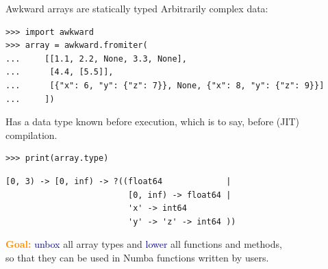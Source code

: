 \documentclass[aspectratio=169]{beamer}
\begin{document}
\begin{frame}[fragile]{Awkward arrays are statically typed}
\vspace{0.5 cm}
Arbitrarily complex data:
{\small
\begin{verbatim}
>>> import awkward
>>> array = awkward.fromiter(
...     [[1.1, 2.2, None, 3.3, None],
...      [4.4, [5.5]],
...      [{"x": 6, "y": {"z": 7}}, None, {"x": 8, "y": {"z": 9}}]
...     ])
\end{verbatim}
}

\vspace{0.5 cm}
Has a data type known before execution, which is to say, before (JIT) compilation.
{\small
\begin{verbatim}
>>> print(array.type)
\end{verbatim}
\begin{verbatim}
[0, 3) -> [0, inf) -> ?((float64             |
                         [0, inf) -> float64 |
                         'x' -> int64
                         'y' -> 'z' -> int64 ))
\end{verbatim}
}
\end{frame}

\begin{frame}{}
\Large
\vspace{1.5 cm}
\textcolor{darkorange}{\bf Goal:} \textcolor{darkblue}{unbox} all array types and \textcolor{darkblue}{lower} all functions and methods, \\
so that they can be used in Numba functions written by users.

\vspace{1 cm}

\vspace{1 cm}
\end{frame}
\end{document}
